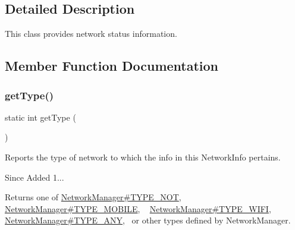 \subsection{Detailed Description}
This class provides network status information. 

\subsection{Member Function Documentation}
\mbox{\label{classcom_1_1toast_1_1android_1_1gamebase_1_1_gamebase_1_1_network_a266dfc4b57f7c115e6323b37841f9f83}} 
\subsubsection{\texorpdfstring{get\+Type()}{getType()}}
{\footnotesize\ttfamily static int get\+Type (\begin{DoxyParamCaption}{ }\end{DoxyParamCaption})\hspace{0.3cm}{\ttfamily [static]}}



Reports the type of network to which the info in this Network\+Info pertains. 

\begin{DoxySince}{Since}
Added 1... 
\end{DoxySince}
\begin{DoxyReturn}{Returns}
one of \hyperlink{classcom_1_1toast_1_1android_1_1gamebase_1_1base_1_1_network_manager_ab6a262f93c8f7b229f0d9968f15ae328}{Network\+Manager\#\+T\+Y\+P\+E\+\_\+\+N\+OT}, \hyperlink{classcom_1_1toast_1_1android_1_1gamebase_1_1base_1_1_network_manager_acdbf2cda592e7b95d250246e4eab7cee}{Network\+Manager\#\+T\+Y\+P\+E\+\_\+\+M\+O\+B\+I\+LE}, ~\newline
 \hyperlink{classcom_1_1toast_1_1android_1_1gamebase_1_1base_1_1_network_manager_acf729cc484f4b6d0e535f19ed31614b5}{Network\+Manager\#\+T\+Y\+P\+E\+\_\+\+W\+I\+FI}, \hyperlink{classcom_1_1toast_1_1android_1_1gamebase_1_1base_1_1_network_manager_ac89feff3bdce716ffc4abafec7cc04d4}{Network\+Manager\#\+T\+Y\+P\+E\+\_\+\+A\+NY},~\newline
 or other types defined by Network\+Manager. 
\end{DoxyReturn}
\mbox{\label{classcom_1_1toast_1_1android_1_1gamebase_1_1_gamebase_1_1_network_afc9b9c5fd3623a1bc4efb56deab90dbf}} 
